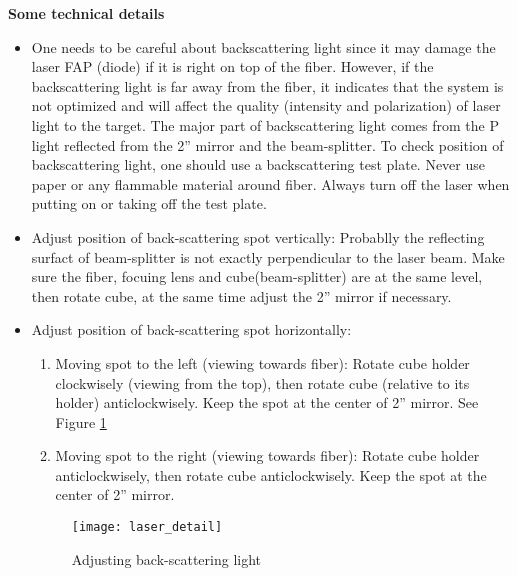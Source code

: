 \medskip
\noindent
{\bf{Some technical details}}
\begin{itemize}
\item One needs to be careful about backscattering light since it may
damage the laser FAP (diode) if it is right on top of the fiber.
However, if the backscattering light is far away from the fiber, it
indicates that the system is not optimized and will affect the quality
(intensity and polarization) of laser light to the target.  The major
part of backscattering light comes from the P light reflected from the
2'' mirror and the beam-splitter. To check position of backscattering 
light, one should use a backscattering
test plate.  Never use paper or any flammable material around fiber.
Always turn off the laser when putting on or taking off the test plate.

\item Adjust position of back-scattering spot vertically: 
Probablly the reflecting surfact of beam-splitter is not exactly
perpendicular to the laser beam.  Make sure the fiber, focuing lens
and cube(beam-splitter) are at the same level, then rotate cube, at
the same time adjust the 2'' mirror if necessary.

\item Adjust position of back-scattering spot horizontally:
\begin{enumerate}
\item Moving spot to the left (viewing towards fiber): Rotate cube
holder clockwisely (viewing from the top), then rotate cube (relative
to its holder) anticlockwisely.  Keep the spot at the center of 2''
mirror.  See Figure \ref{fig:laser_detail}

\item Moving spot to the right (viewing towards fiber): Rotate cube
holder anticlockwisely, then rotate cube anticlockwisely.  Keep the 
spot at the center of 2'' mirror.
\end{enumerate}

\begin{figure}
\begin{center}
\centerline{\texttt{[image: laser\_detail]}}
\end{center}
\caption{Adjusting back-scattering light}
\label{fig:laser_detail}
\end{figure}

\end{itemize}


